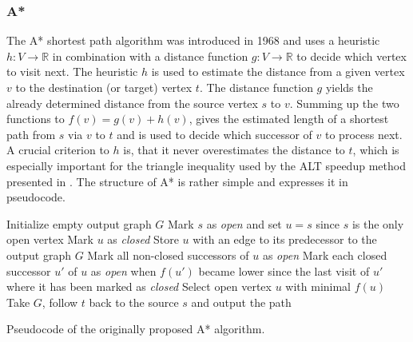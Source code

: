 		\subsubsection{A*}
		\label{subsubsec:astar}
		
			The A* shortest path algorithm was introduced in 1968 and uses a heuristic $h : V \rightarrow \mathbb{R}$ in combination with a distance function $g : V \rightarrow \mathbb{R}$ to decide which vertex to visit next\cite{astar}.
			The heuristic $h$ is used to estimate the distance from a given vertex $v$ to the destination (or target) vertex $t$.
			The distance function $g$ yields the already determined distance from the source vertex $s$ to $v$.
			Summing up the two functions to $f(v) = g(v) + h(v)$, gives the estimated length of a shortest path from $s$ via $v$ to $t$ and is used to decide which successor of $v$ to process next.
			A crucial criterion to $h$ is, that it never overestimates the distance to $t$, which is especially important for the triangle inequality used by the ALT speedup method presented in .
			The structure of A* is rather simple and  expresses it in pseudocode.
			
			\begin{algorithm}[h]
				\begin{algorithmic}[1]
					\State Initialize empty output graph $G$
					\State Mark $s$ as \emph{open} and set $u = s$ since $s$ is the only open vertex
						\State Mark $u$ as \emph{closed}
						\State Store $u$ with an edge to its predecessor to the output graph $G$
						\State Mark all non-closed successors of $u$ as \emph{open} \label{alg:astar-open-1}
						\State Mark each closed successor $u'$ of $u$ as \emph{open} when $f(u')$ became lower since the last visit of $u'$ where it has been marked as \emph{closed} \label{alg:astar-open-2}
						\State Select open vertex $u$ with minimal $f(u)$
					\EndWhile
					\State Take $G$, follow $t$ back to the source $s$ and output the path
				\end{algorithmic}
				\caption{Pseudocode of the originally proposed A* algorithm\cite{astar}.}
				\label{alg:astar}
			\end{algorithm}
			
